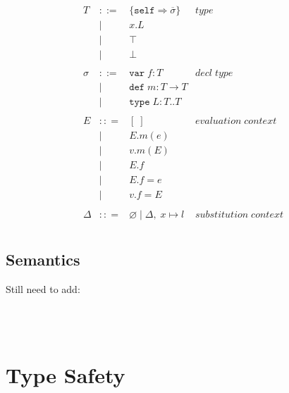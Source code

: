 \documentclass{llncs}
\begin{document}
\[\begin{array}{lll}
\begin{array}{lllr}
T & ::= & \{\texttt{self} \Rightarrow \overline{\sigma}\} & type \\
& | & x.L &\\
& | & \top & \\
& | & \bot & \\
&&\\
\sigma & ::= & \texttt{var} \; f:T & decl \; type\\
       & |   & \texttt{def} \; m:T \rightarrow T \\
		 & |   & \texttt{type} \; L : T .. T &\\
&&\\
E & :: = & [\;] & evaluation \; context \\
       & | & E.m(e)\\
       & | & v.m(E)\\
       & | & E.f\\
       & | & E.f = e\\
       & | & v.f = E\\
&&\\
\Delta & :: = & \varnothing \; | \; \Delta,\; x \mapsto l & substitution \; context \\
\end{array}
\end{array}
\]

\subsection{Semantics}










Still need to add:

\hfill {}\\


\hfill {}
\\

\section{Type Safety}
\end{document}
